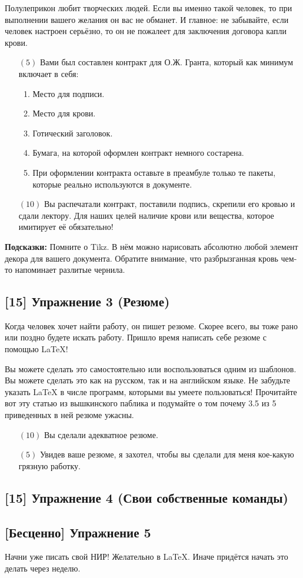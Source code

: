 \documentclass[12pt, a4paper, oneside]{article}
\begin{document}
Полулеприкон любит творческих людей. Если вы именно такой человек, то при выполнении вашего желания он вас не обманет. И главное: не забывайте, если человек настроен серьёзно, то он не пожалеет для заключения договора капли крови.

\begin{itemize}
	\item[$(5)$]   Вами был составлен контракт для О.Ж. Гранта, который как минимум включает в себя:
	
	\begin{enumerate}
		\item  Место для подписи.
		\item  Место для крови.
		\item  Готический заголовок.
		\item  Бумага, на которой оформлен контракт немного состарена.
		\item  При оформлении контракта оставьте в преамбуле только те пакеты, которые реально используются в документе.
	\end{enumerate}
	
	\item[$(10)$] Вы распечатали контракт, поставили подпись, скрепили его кровью и сдали лектору. Для наших целей наличие крови или вещества, которое имитирует её обязательно!
\end{itemize}

\textbf{Подсказки:}  Помните о Tikz. В нём можно нарисовать абсолютно любой элемент декора для вашего документа. Обратите внимание, что разбрызганная кровь чем-то напоминает разлитые чернила.


\subsection*{[15]  Упражнение 3 (Резюме)}

Когда человек хочет найти работу, он пишет резюме. Скорее всего, вы тоже рано или поздно будете искать работу. Пришло время написать себе резюме с помощью \LaTeX{}!

Вы можете сделать это самостоятельно или воспользоваться одним из шаблонов. Вы можете сделать это как на русском, так и на английском языке. Не забудьте указать  \LaTeX{} в числе программ, которыми вы умеете пользоваться!  Прочитайте вот эту статью из вышкинского паблика и подумайте о том почему 3.5 из 5 приведенных в ней резюме ужасны. 

\begin{itemize}
\item[$(10)$] Вы сделали адекватное резюме.
\item[$(5)$] Увидев ваше резюме, я захотел, чтобы вы сделали для меня кое-какую грязную работку.
\end{itemize}


\subsection*{[15]  Упражнение 4 (Свои собственные команды)}





\subsection*{ [Бесценно]  Упражнение 5}

Начни уже писать свой НИР! Желательно в  \LaTeX.  Иначе придётся начать это делать через неделю. 
\end{document}
